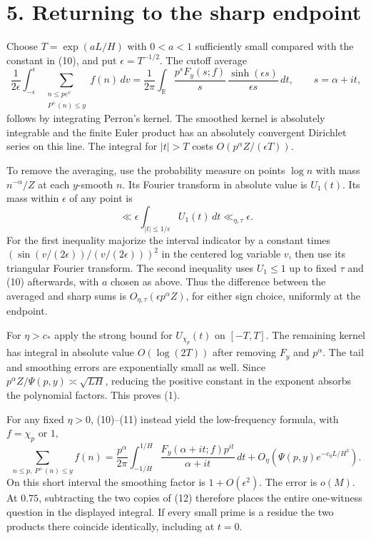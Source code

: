 \documentclass[11pt]{article}
\newcommand{\dd}{\,dt}
\newcommand{\ch}{\chi_p}
\begin{document}
\newpage
\section*{5. Returning to the sharp endpoint}
Choose \(T=\exp(aL/H)\) with \(0<a<1\) sufficiently small compared with
the constant in (10), and put \(\epsilon=T^{-1/2}\). The cutoff average
\[
 \frac1{2\epsilon}\int_{-\epsilon}^{\epsilon}
       \sum_{\substack{n\le pe^v\\P^+(n)\le y}}f(n)\,dv
 =\frac1{2\pi}\int_{\mathbb R}
   \frac{p^sF_y(s;f)}s\,\frac{\sinh(\epsilon s)}{\epsilon s}\,dt,
 \qquad s=\alpha+it ,
\]
follows by integrating Perron's kernel. The smoothed kernel is absolutely
integrable and the finite Euler product has an absolutely convergent
Dirichlet series on this line. The integral for \(|t|>T\) costs
\(O(p^\alpha Z/(\epsilon T))\).

To remove the averaging, use the probability measure on points \(\log n\)
with mass \(n^{-\alpha}/Z\) at each \(y\)-smooth \(n\). Its Fourier
transform in absolute value is \(U_1(t)\). Its mass within \(\epsilon\)
of any point is
\[
 \ll\epsilon\int_{|t|\le1/\epsilon}U_1(t)\dd\ll_{\eta,\tau}\epsilon .
\]
For the first inequality majorize the interval indicator by a constant
times \((\sin(v/(2\epsilon))/(v/(2\epsilon)))^2\) in the centered log
variable \(v\), then use its triangular Fourier transform. The second
inequality uses \(U_1\le1\) up to fixed \(\tau\) and (10) afterwards,
with \(a\) chosen as above. Thus the difference between the averaged and
sharp sums is \(O_{\eta,\tau}(\epsilon p^\alpha Z)\), for either sign
choice, uniformly at the endpoint.

For \(\eta>c_*\) apply the strong bound for \(U_{\ch}(t)\) on
\([-T,T]\). The remaining kernel has integral in absolute value
\(O(\log(2T))\) after removing \(F_y\) and \(p^\alpha\).
The tail and smoothing errors are exponentially small as well.
Since \(p^\alpha Z/\Psi(p,y)\asymp\sqrt{LH}\), reducing the positive
constant in the exponent absorbs the polynomial factors. This proves (1).

For any fixed \(\eta>0\), (10)--(11) instead yield the low-frequency
formula, with \(f=\ch\) or \(1\),
\begin{equation}
 \sum_{n\le p,\ P^+(n)\le y} f(n)=
 \frac{p^\alpha}{2\pi}\int_{-1/H}^{1/H}
       \frac{F_y(\alpha+it;f)p^{it}}{\alpha+it}\dd
 +O_\eta\!\left(\Psi(p,y)e^{-c_\eta L/H^3}\right).
\end{equation}
On this short interval the smoothing factor is \(1+O(\epsilon^2)\).
The error is \(o(M)\). At \(0.75\), subtracting the two copies of (12)
therefore places the entire one-witness question in the displayed
integral. If every small prime is a residue the two products there
coincide identically, including at \(t=0\).
\end{document}
